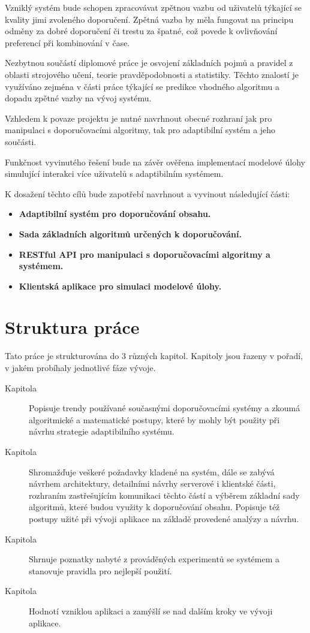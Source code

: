 \documentclass[thesis=M,czech]{FITthesis}[2014/05/07]
\begin{document}
\begin{introduction}
	Vzniklý systém bude schopen zpracovávat zpětnou vazbu od uživatelů týkající se kvality jimi zvoleného doporučení. Zpětná vazba by měla fungovat na principu odměny za dobré doporučení či trestu za špatné, což povede k ovlivňování preferencí při kombinování v čase.
		
	Nezbytnou součástí diplomové práce je osvojení základních pojmů a pravidel z oblasti strojového učení, teorie pravděpodobnosti a statistiky. Těchto znalostí je využíváno zejména v části práce týkající se predikce vhodného algoritmu a dopadu zpětné vazby na vývoj systému. 
	
	Vzhledem k povaze projektu je nutné navrhnout obecné rozhraní jak pro manipulaci s doporučovacími algoritmy, tak pro adaptibilní systém a jeho součásti.
	
	Funkčnost vyvinutého řešení bude na závěr ověřena implementací modelové úlohy simulující interakci více uživatelů s adaptibilním systémem. 
	
	K dosažení těchto cílů bude zapotřebí navrhnout a vyvinout následující části:

\begin{itemize}
  \item \textbf{Adaptibilní systém pro doporučování obsahu.}
  \item \textbf{Sada základních algoritmů určených k doporučování.}
  \item \textbf{RESTful API pro manipulaci s doporučovacími algoritmy a systémem.}
  \item \textbf{Klientská aplikace pro simulaci modelové úlohy.}  
\end{itemize}	

\section{Struktura práce}
\label{sec:structure}
	Tato práce je strukturována do 3 různých kapitol. Kapitoly jsou řazeny v pořadí, v jakém probíhaly jednotlivé fáze vývoje.	

\begin{description}
  \item[Kapitola ] Popisuje trendy používané současnými doporučovacími systémy a zkoumá algoritmické a matematické postupy, které by mohly být použity při návrhu strategie adaptibilního systému.
  \item[Kapitola ] Shromažďuje veškeré požadavky kladené na systém, dále se zabývá návrhem architektury, detailními návrhy serverové i klientské části, rozhraním zastřešujícím komunikaci těchto částí a výběrem základní sady algoritmů, které budou využity k doporučování obsahu. Popisuje též postupy užité při vývoji aplikace na základě provedené analýzy a návrhu.
  \item[Kapitola ] Shrnuje poznatky nabyté z prováděných experimentů se systémem a stanovuje pravidla pro nejlepší použití.
  \item[Kapitola ] Hodnotí vzniklou aplikaci a zamýšlí se nad dalším kroky ve vývoji aplikace.
\end{description}
	
\end{introduction}
\end{document}
